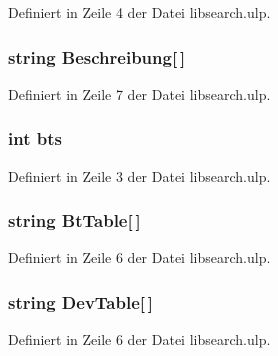 Definiert in Zeile 4 der Datei libsearch.\+ulp.

\hypertarget{libsearch_8ulp_a0165df64e95135bade509c58bdb353f1}{}
\subsubsection[{Beschreibung}]{\setlength{\rightskip}{0pt plus 5cm}string Beschreibung\mbox{[}$\,$\mbox{]}}\label{libsearch_8ulp_a0165df64e95135bade509c58bdb353f1}


Definiert in Zeile 7 der Datei libsearch.\+ulp.

\hypertarget{libsearch_8ulp_a00c6cb851706bdde7570b25efe80733a}{}
\subsubsection[{bts}]{\setlength{\rightskip}{0pt plus 5cm}int bts}\label{libsearch_8ulp_a00c6cb851706bdde7570b25efe80733a}


Definiert in Zeile 3 der Datei libsearch.\+ulp.

\hypertarget{libsearch_8ulp_af0d191df3e333660839f50e87bc098c8}{}
\subsubsection[{Bt\+Table}]{\setlength{\rightskip}{0pt plus 5cm}string Bt\+Table\mbox{[}$\,$\mbox{]}}\label{libsearch_8ulp_af0d191df3e333660839f50e87bc098c8}


Definiert in Zeile 6 der Datei libsearch.\+ulp.

\hypertarget{libsearch_8ulp_a44f73a7606acf532b5a5c0eb0aef6fbc}{}
\subsubsection[{Dev\+Table}]{\setlength{\rightskip}{0pt plus 5cm}string Dev\+Table\mbox{[}$\,$\mbox{]}}\label{libsearch_8ulp_a44f73a7606acf532b5a5c0eb0aef6fbc}


Definiert in Zeile 6 der Datei libsearch.\+ulp.

